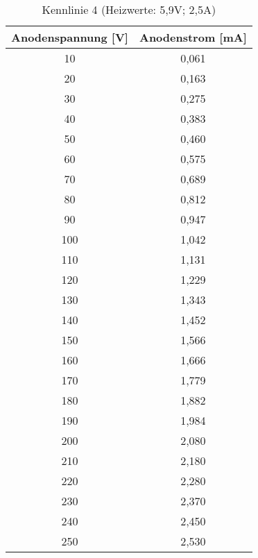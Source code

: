 \begin{table}[h]
	\begin{center}
		\begin{tabular}{cc}
			Anodenspannung [V] & Anodenstrom [mA]\\ \hline
			10	&0,061\\
			20	&0,163\\
			30	&0,275\\
			40	&0,383\\
			50	&0,460\\
			60	&0,575\\
			70	&0,689\\
			80	&0,812\\
			90	&0,947\\
			100	&1,042\\
			110	&1,131\\
			120	&1,229\\
			130	&1,343\\
			140	&1,452\\
			150	&1,566\\
			160	&1,666\\
			170	&1,779\\
			180	&1,882\\
			190	&1,984\\
			200	&2,080\\
			210	&2,180\\
			220	&2,280\\
			230	&2,370\\
			240	&2,450\\
			250	&2,530
		\end{tabular}
		\caption{Kennlinie 4 (Heizwerte: 5,9V; 2,5A)}
		\label{taba4}
	\end{center}
\end{table}